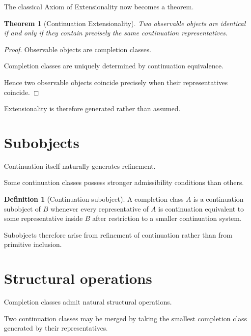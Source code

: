\documentclass[13pt,openany]{book}
\theoremstyle{plain}
\newtheorem{theorem}{Theorem}[chapter]
\theoremstyle{definition}
\newtheorem{definition}{Definition}[chapter]
\begin{document}
The classical Axiom of Extensionality now becomes a theorem.

\begin{theorem}[Continuation Extensionality]
Two observable objects are identical if and only if they contain precisely
the same continuation representatives.
\end{theorem}

\begin{proof}
Observable objects are completion classes.

Completion classes are uniquely determined by continuation equivalence.

Hence two observable objects coincide precisely when their representatives
coincide.
\end{proof}

Extensionality is therefore generated rather than assumed.


\section{Subobjects}

Continuation itself naturally generates refinement.

Some continuation classes possess stronger admissibility conditions than
others.

\begin{definition}[Continuation subobject]
A completion class $A$ is a continuation subobject of $B$ whenever every
representative of $A$ is continuation equivalent to some representative
inside $B$ after restriction to a smaller continuation system.
\end{definition}

Subobjects therefore arise from refinement of continuation rather than from
primitive inclusion.


\section{Structural operations}

Completion classes admit natural structural operations.

Two continuation classes may be merged by taking the smallest completion
class generated by their representatives.
\end{document}
